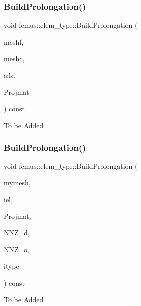\subsubsection{\texorpdfstring{Build\+Prolongation()}{BuildProlongation()}\hspace{0.1cm}{\footnotesize\ttfamily [2/3]}}
{\footnotesize\ttfamily void femus\+::elem\+\_\+type\+::\+Build\+Prolongation (\begin{DoxyParamCaption}\item[{const \mbox{\hyperlink{classfemus_1_1_mesh}{Mesh}} \&}]{meshf,  }\item[{const \mbox{\hyperlink{classfemus_1_1_mesh}{Mesh}} \&}]{meshc,  }\item[{const int \&}]{ielc,  }\item[{\mbox{\hyperlink{classfemus_1_1_sparse_matrix}{Sparse\+Matrix}} $\ast$}]{Projmat }\end{DoxyParamCaption}) const}

To be Added \mbox{\label{classfemus_1_1elem__type_acb499269b353c8b3e0ebb5e21254b108}} 
\subsubsection{\texorpdfstring{Build\+Prolongation()}{BuildProlongation()}\hspace{0.1cm}{\footnotesize\ttfamily [3/3]}}
{\footnotesize\ttfamily void femus\+::elem\+\_\+type\+::\+Build\+Prolongation (\begin{DoxyParamCaption}\item[{const \mbox{\hyperlink{classfemus_1_1_mesh}{Mesh}} \&}]{mymesh,  }\item[{const int \&}]{iel,  }\item[{\mbox{\hyperlink{classfemus_1_1_sparse_matrix}{Sparse\+Matrix}} $\ast$}]{Projmat,  }\item[{\mbox{\hyperlink{classfemus_1_1_numeric_vector}{Numeric\+Vector}} $\ast$}]{N\+N\+Z\+\_\+d,  }\item[{\mbox{\hyperlink{classfemus_1_1_numeric_vector}{Numeric\+Vector}} $\ast$}]{N\+N\+Z\+\_\+o,  }\item[{const unsigned \&}]{itype }\end{DoxyParamCaption}) const}

To be Added \mbox{\label{classfemus_1_1elem__type_a204517efabff34e2692a77f4b8bd44e9}} 
